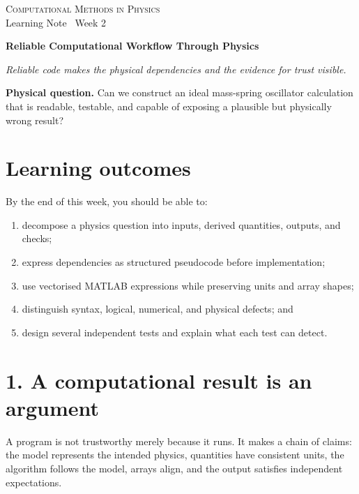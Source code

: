 \documentclass[11pt,a4paper]{article}
\newcommand{\course}{Computational Methods in Physics}
\begin{document}
{\large\textsc{\course}}\\[-2pt]
{\small Learning Note \textbar\ Week 2}\par\vspace{4pt}
{\LARGE\bfseries Reliable Computational Workflow Through Physics}\par\vspace{3pt}
\textit{Reliable code makes the physical dependencies and the evidence for trust visible.}

\begin{keybox}
\textbf{Physical question.} Can we construct an ideal mass-spring oscillator calculation that is readable, testable, and capable of exposing a plausible but physically wrong result?
\end{keybox}

\section*{Learning outcomes}
By the end of this week, you should be able to:
\begin{enumerate}[nosep,leftmargin=5mm]
  \item decompose a physics question into inputs, derived quantities, outputs, and checks;
  \item express dependencies as structured pseudocode before implementation;
  \item use vectorised MATLAB expressions while preserving units and array shapes;
  \item distinguish syntax, logical, numerical, and physical defects; and
  \item design several independent tests and explain what each test can detect.
\end{enumerate}

\section*{1. A computational result is an argument}
A program is not trustworthy merely because it runs. It makes a chain of claims: the model represents the intended physics, quantities have consistent units, the algorithm follows the model, arrays align, and the output satisfies independent expectations.
\end{document}
